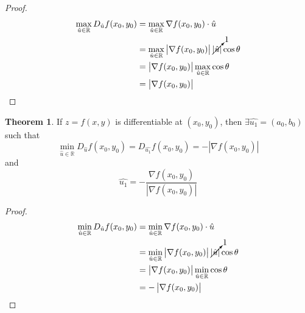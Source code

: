 \documentclass[fleqn, a4paper, 12pt, twoside]{article}
\theoremstyle{definition}
\theoremstyle{theorem}
\newtheorem{theorem}{Theorem}
\begin{document}
{\begin{proof}
	\begin{align*}
		\max\limits_{\hat{u} \in \mathbb{R}} D_{\hat{u}} f(x_0, y_0) & = \max\limits_{\hat{u} \in \mathbb{R}} \nabla f(x_0, y_0) \cdot \hat{u}                                                   \\
                                                                             & = \max\limits_{\hat{u} \in \mathbb{R}} \left| \nabla f(x_0, y_0) \right| \cancelto{1}{\left| \hat{u} \right|} \cos \theta \\
                                                                             & = \left| \nabla f(x_0, y_0) \right| \max\limits_{\hat{u} \in \mathbb{R}} \cos \theta                                      \\
                                                                             & = \left| \nabla f(x_0, y_0) \right|
	\end{align*}
\end{proof}

\begin{theorem}
	If $z = f(x,y)$ is differentiable at $(x_0,y_0)$, then $\exists \hat{u_1} = (a_0, b_0)$ such that
	\begin{equation*}
		\min\limits_{\hat{u} \in \mathbb{R}} D_{\hat{u}} f(x_0, y_0) = D_{\hat{u_1}} f(x_0, y_0) = -\left| \nabla f(x_0, y_0) \right|
	\end{equation*}
	and
	\begin{equation*}
		\hat{u_1} = -\frac{\nabla f(x_0, y_0)}{\left| \nabla f(x_0, y_0) \right|}
	\end{equation*}
\end{theorem}

\begin{proof}
	\begin{align*}
		\min\limits_{\hat{u} \in \mathbb{R}} D_{\hat{u}} f(x_0, y_0) & = \min\limits_{\hat{u} \in \mathbb{R}} \nabla f(x_0, y_0) \cdot \hat{u}                                                   \\
                                                                             & = \min\limits_{\hat{u} \in \mathbb{R}} \left| \nabla f(x_0, y_0) \right| \cancelto{1}{\left| \hat{u} \right|} \cos \theta \\
                                                                             & = \left| \nabla f(x_0, y_0) \right| \min\limits_{\hat{u} \in \mathbb{R}} \cos \theta                                      \\
                                                                             & = -\left| \nabla f(x_0, y_0) \right|
	\end{align*}
\end{proof}

}
\end{document}
